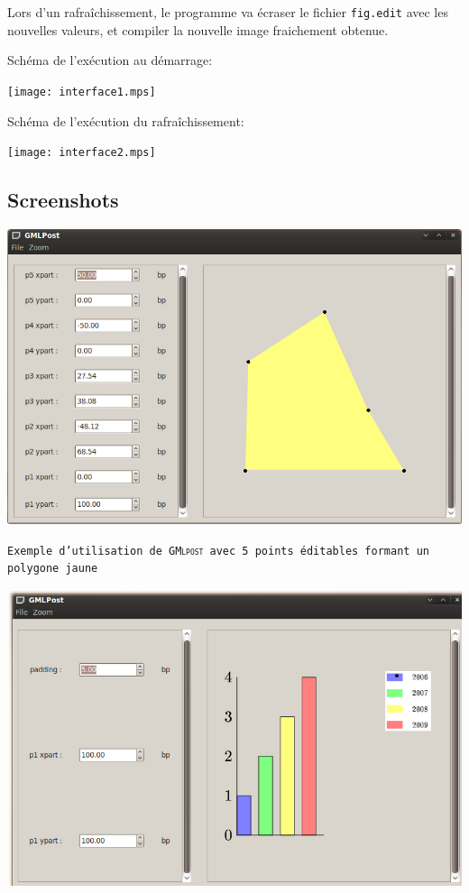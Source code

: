 \documentclass[a4paper,12pt]{article}
\newcommand{\gmlpost}{\textsc{GMlpost}}
\begin{document}
Lors d'un rafraîchissement, le programme va écraser le fichier \texttt{fig.edit} avec les nouvelles valeurs, et compiler la nouvelle image fraichement obtenue.

\bigskip

Schéma de l'exécution au démarrage:
\begin{center}
\texttt{[image: interface1.mps]}
\end{center}

\bigskip

Schéma de l'exécution du rafraîchissement:
\begin{center}
\texttt{[image: interface2.mps]}
\end{center}

\newpage
\subsection{Screenshots}
\bigskip

\includegraphics[scale=0.45]{screen1.png}

\begin{center}
\texttt{Exemple d'utilisation de \gmlpost\ avec 5 points éditables formant un polygone jaune} 
\end{center}

\includegraphics[scale=0.45]{screen2.png}
\end{document}
